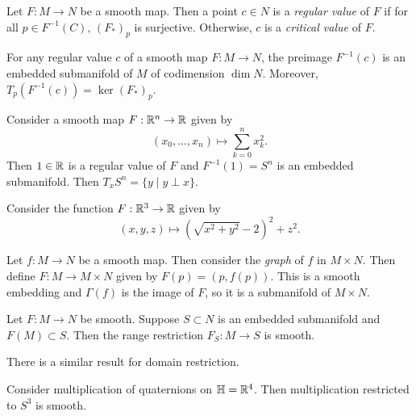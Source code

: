\documentclass[twoside, 10pt]{article}
\begin{document}
    \begin{defn}
        Let $F:M \to N$ be a smooth map. Then a point $c \in N$ is a \textit{regular value} of $F$ if for all $p \in F^{-1}(C)$, $(F_*)_p$ is surjective. Otherwise, $c$ is a \textit{critical value} of $F$.
    \end{defn}

    \begin{cor}
        For any regular value $c$ of a smooth map $F:M \to N$, the preimage $F^{-1}(c)$ is an embedded submanifold of $M$ of codimension $\dim N$. Moreover, $T_p(F^{-1}(c)) = \ker (F_*)_p$.
    \end{cor}

    \begin{exm}
        Consider a smooth map $F: \mathbb{R}^n \to \mathbb{R}$ given by 
        \[ (x_0, \ldots, x_n) \mapsto \sum_{k=0}^n x_k^2.\]
        Then $1 \in \mathbb{R}$ is a regular value of $F$ and $F^{-1}(1) = S^n$ is an embedded submanifold. Then $T_xS^n = \{y \mid y \perp x\}$.
    \end{exm}

    \begin{exm}
        Consider the function $F: \mathbb{R}^3 \to \mathbb{R}$ given by 
        \[ (x,y,z) \mapsto (\sqrt{x^2+y^2}-2)^2 + z^2.\]
    \end{exm}

    \begin{exm}
        Let $f: M \to N$ be a smooth map. Then consider the \textit{graph} of $f$ in $M \times N$. Then define $F: M \to M \times N$ given by $F(p) = (p,f(p))$. This is a smooth embedding and $\Gamma(f)$ is the image of $F$, so it is a submanifold of $M \times N$.
    \end{exm}

    \begin{prop}
        Let $F: M \to N$ be smooth. Suppose $S \subset N$ is an embedded submanifold and $F(M) \subset S$. Then the range restriction $F_S:M \to S$ is smooth.
    \end{prop}

    \begin{rmk}
        There is a similar result for domain restriction.
    \end{rmk}

    \begin{exm}
        Consider multiplication of quaternions on $\mathbb{H} = \mathbb{R}^4$. Then multiplication restricted to $S^3$ is smooth.
    \end{exm}

    
\end{document}
